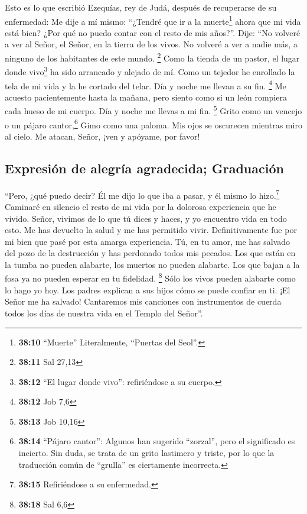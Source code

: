  Esto es lo que escribió Ezequías, rey de Judá, después de
recuperarse de su enfermedad:  Me dije a mí mismo:
``¿Tendré que ir a la muerte\footnote{\textbf{38:10} ``Muerte''
  Literalmente, ``Puertas del Seol''.} ahora que mi vida está bien? ¿Por
qué no puedo contar con el resto de mis años?''.  Dije:
``No volveré a ver al Señor, el Señor, en la tierra de los vivos. No
volveré a ver a nadie más, a ninguno de los habitantes de este mundo.
\footnote{\textbf{38:11} Sal 27,13}  Como la tienda de un
pastor, el lugar donde vivo\footnote{\textbf{38:12} ``El lugar donde
  vivo'': refiriéndose a su cuerpo.} ha sido arrancado y alejado de mí.
Como un tejedor he enrollado la tela de mi vida y la he cortado del
telar. Día y noche me llevan a su fin. \footnote{\textbf{38:12} Job 7,6}
 Me acuesto pacientemente hasta la mañana, pero siento
como si un león rompiera cada hueso de mi cuerpo. Día y noche me llevas
a mi fin. \footnote{\textbf{38:13} Job 10,16}  Grito como
un vencejo o un pájaro cantor,\footnote{\textbf{38:14} ``Pájaro
  cantor'': Algunos han sugerido ``zorzal'', pero el significado es
  incierto. Sin duda, se trata de un grito lastimero y triste, por lo
  que la traducción común de ``grulla'' es ciertamente incorrecta.} Gimo
como una paloma. Mis ojos se oscurecen mientras miro al cielo. Me
atacan, Señor, ¡ven y apóyame, por favor!

\hypertarget{expresiuxf3n-de-alegruxeda-agradecida-graduaciuxf3n}{%
\subsection{Expresión de alegría agradecida;
Graduación}\label{expresiuxf3n-de-alegruxeda-agradecida-graduaciuxf3n}}

 ``Pero, ¿qué puedo decir? Él me dijo lo que iba a pasar,
y él mismo lo hizo.\footnote{\textbf{38:15} Refiriéndose a su
  enfermedad.} Caminaré en silencio el resto de mi vida por la dolorosa
experiencia que he vivido.  Señor, vivimos de lo que tú
dices y haces, y yo encuentro vida en todo esto. Me has devuelto la
salud y me has permitido vivir.  Definitivamente fue por
mi bien que pasé por esta amarga experiencia. Tú, en tu amor, me has
salvado del pozo de la destrucción y has perdonado todos mis pecados.
 Los que están en la tumba no pueden alabarte, los
muertos no pueden alabarte. Los que bajan a la fosa ya no pueden esperar
en tu fidelidad. \footnote{\textbf{38:18} Sal 6,6}  Sólo
los vivos pueden alabarte como lo hago yo hoy. Los padres explican a sus
hijos cómo se puede confiar en ti.  ¡El Señor me ha
salvado! Cantaremos mis canciones con instrumentos de cuerda todos los
días de nuestra vida en el Templo del Señor''.

